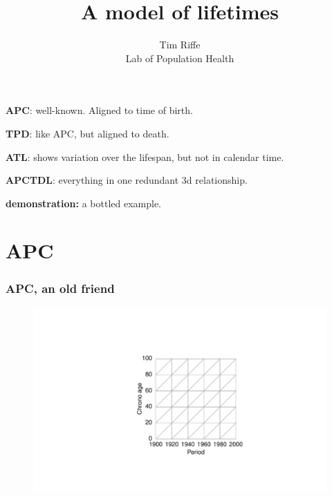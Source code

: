 \documentclass[20pt]{beamer}
\title{A model of lifetimes}
\subtitle{Tim Riffe\\ Lab of Population Health}		%
\begin{document}
\begin{frame}
	\titlepage
\end{frame}

\begin{frame}%
  \begin{description}
    \item<1->{\textbf{APC}:} well-known. Aligned to time of birth.
    \item<2->{\textbf{TPD}:} like APC, but aligned to death.
    \item<3->{\textbf{ATL}:} shows variation over the lifespan, but not in
    calendar time.
    \item<4->{\textbf{APCTDL}:} everything in one redundant 3d relationship.
    \item<5->{\textbf{demonstration:}} a bottled example.
  \end{description}
\end{frame}

\section{APC}
\begin{frame}
\frametitle{APC, an old friend}
\begin{figure}[b]
    \centering
    \includegraphics{Figures/LabPres/APC1.pdf}
\end{figure} 
\end{frame}
\end{document}

